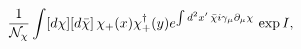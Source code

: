 \begin{equation}
\frac{1}{{\cal N}_\chi}\int [d\chi][d\bar{\chi}]\,\chi_+ (x)\chi^\dagger_+(y) e^{\int d^2x'\, \bar{\chi}i\gamma_{\mu}\partial_{\mu} \chi} \, \exp {I},
\label{chi1}
\end{equation}

